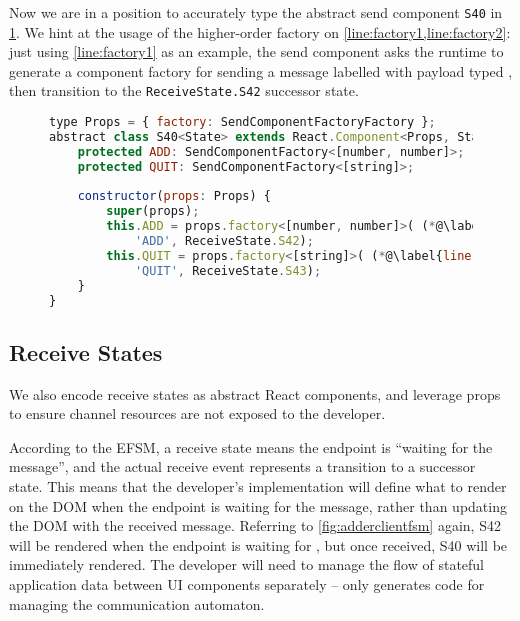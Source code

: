 Now we are in a position to accurately type the abstract
send component \texttt{S40} in \cref{lst:reactsendcomponent}.
We hint at the usage of the higher-order factory on
\cref{line:factory1,line:factory2}:
just using \cref{line:factory1} as an example,
the send component asks the runtime to generate a 
component factory for sending a message 
labelled 
with payload typed
,
then transition to the \texttt{ReceiveState.S42}
successor state.

\begin{figure}[!h]
\begin{lstlisting}[language=javascript,tabsize=2,title=S40.tsx]
type Props = { factory: SendComponentFactoryFactory };
abstract class S40<State> extends React.Component<Props, State> {
	protected ADD: SendComponentFactory<[number, number]>;
	protected QUIT: SendComponentFactory<[string]>;
	
	constructor(props: Props) {
		super(props);
		this.ADD = props.factory<[number, number]>( (*@\label{line:factory1}@*)
			'ADD', ReceiveState.S42);
		this.QUIT = props.factory<[string]>( (*@\label{line:factory2}@*)
			'QUIT', ReceiveState.S43);
	}
}
\end{lstlisting}
\label{lst:reactsendcomponent}
\end{figure}

\subsection{Receive States}

We also encode receive states as abstract React components,
and leverage props to ensure channel resources are not exposed
to the developer.

According to the EFSM, a receive state means
the endpoint is ``waiting for the message'',
and the actual receive event represents a transition
to a successor state.
This means that the developer's implementation will define
what to render on the DOM when the endpoint is waiting
for the message, rather than updating the DOM with the
received message.
Referring to \cref{fig:adderclientfsm} again,
S42 will be rendered when the endpoint is waiting for
, but once received, S40 will be immediately
rendered. The developer will need to manage the flow
of stateful application data between UI components separately
--  only generates code for managing
the communication automaton.

